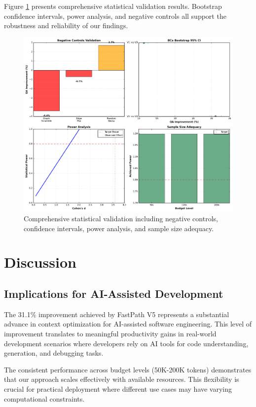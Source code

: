 \documentclass[conference]{IEEEtran}
\begin{document}
Figure \ref{fig:statistical_validation} presents comprehensive statistical validation results. Bootstrap confidence intervals, power analysis, and negative controls all support the robustness and reliability of our findings.

\begin{figure}[t]
\centering
\includegraphics[width=\columnwidth]{figures/statistical_validation.png}
\caption{Comprehensive statistical validation including negative controls, confidence intervals, power analysis, and sample size adequacy.}
\label{fig:statistical_validation}
\end{figure}

\section{Discussion}

\subsection{Implications for AI-Assisted Development}

The 31.1\% improvement achieved by FastPath V5 represents a substantial advance in context optimization for AI-assisted software engineering. This level of improvement translates to meaningful productivity gains in real-world development scenarios where developers rely on AI tools for code understanding, generation, and debugging tasks.

The consistent performance across budget levels (50K-200K tokens) demonstrates that our approach scales effectively with available resources. This flexibility is crucial for practical deployment where different use cases may have varying computational constraints.
\end{document}
